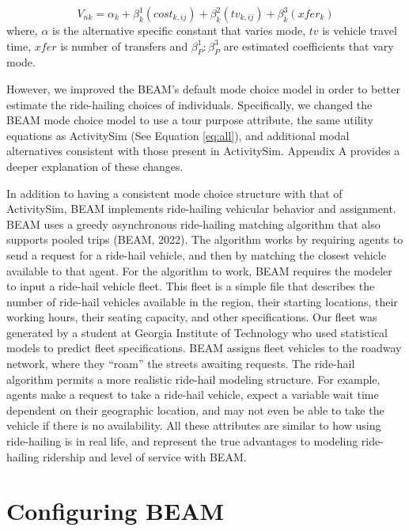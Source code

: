 \documentclass[fancy, masters]{byuthesis}
\begin{document}
\begin{equation}
  V_{nk} = \alpha_{k} + \beta_k^1(cost_{k,ij}) + \beta_k^2(tv_{k,ij}) + \beta_k^3(xfer_{k}) \label{eq:beam}
\end{equation}
where, \(\alpha\) is the alternative specific constant that varies mode, \(tv\) is vehicle travel time, \(xfer\) is number of transfers and \(\beta_{P}^1:\beta_{P}^{3}\) are estimated coefficients that vary mode.

However, we improved the BEAM's default mode choice model in order to better estimate the ride-hailing choices of individuals. Specifically, we changed the BEAM mode choice model to use a tour purpose attribute, the same utility equations as ActivitySim (See Equation \eqref{eq:all}), and additional modal alternatives consistent with those present in ActivitySim. Appendix A provides a deeper explanation of these changes.

In addition to having a consistent mode choice structure with that of ActivitySim, BEAM implements ride-hailing vehicular behavior and assignment. BEAM uses a greedy asynchronous ride-hailing matching algorithm that also supports pooled trips (BEAM, 2022). The algorithm works by requiring agents to send a request for a ride-hail vehicle, and then by matching the closest vehicle available to that agent. For the algorithm to work, BEAM requires the modeler to input a ride-hail vehicle fleet. This fleet is a simple file that describes the number of ride-hail vehicles available in the region, their starting locations, their working hours, their seating capacity, and other specifications. Our fleet was generated by a student at Georgia Institute of Technology who used statistical models to predict fleet specifications. BEAM assigns fleet vehicles to the roadway network, where they ``roam'' the streets awaiting requests. The ride-hail algorithm permits a more realistic ride-hail modeling structure. For example, agents make a request to take a ride-hail vehicle, expect a variable wait time dependent on their geographic location, and may not even be able to take the vehicle if there is no availability. All these attributes are similar to how using ride-hailing is in real life, and represent the true advantages to modeling ride-hailing ridership and level of service with BEAM.

\hypertarget{configuring-beam}{%
\section{Configuring BEAM}\label{configuring-beam}}
\end{document}
